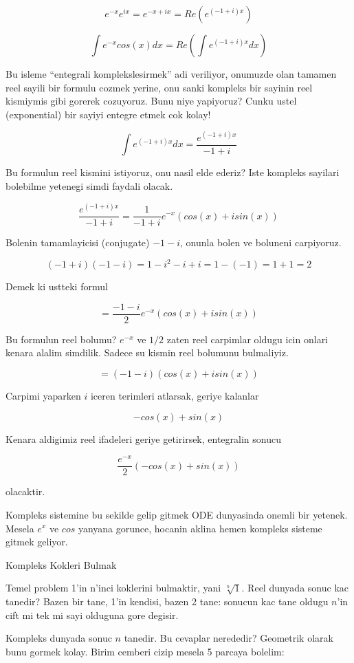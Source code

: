 \documentclass[12pt,fleqn]{article}
\begin{document}
\[ e^{-x}e^{ix} = e^{-x + ix} = Re(e^{(-1+i)x}) \]

\[ \int e^{-x}cos(x) dx = Re (\int e^{(-1+i)x} dx) \]

Bu isleme ``entegrali komplekslesirmek'' adi veriliyor, onumuzde olan
tamamen reel sayili bir formulu cozmek yerine, onu sanki kompleks bir
sayinin reel kismiymis gibi gorerek cozuyoruz. Bunu niye yapiyoruz? Cunku
ustel (exponential) bir sayiyi entegre etmek cok kolay!

\[ \int e^{(-1+i)x} dx = \frac{e^{(-1+i)x}}{-1+i}\]

Bu formulun reel kismini istiyoruz, onu nasil elde ederiz? Iste kompleks
sayilari bolebilme yetenegi simdi faydali olacak.

\[  \frac{e^{(-1+i)x}}{-1+i} = \frac{1}{-1+i} e^{-x}(cos(x) + isin(x))\]

Bolenin tamamlayicisi (conjugate) $-1-i$, onunla bolen ve boluneni
carpiyoruz.

\[ (-1+i)(-1-i) = 1-i^2-i+i = 1-(-1) = 1+1 = 2\]

Demek ki ustteki formul

\[ = \frac{-1-i}{2} e^{-x}(cos(x) + isin(x)) \]

Bu formulun reel bolumu? $e^{-x}$ ve $1/2$ zaten reel carpimlar oldugu icin
onlari kenara alalim simdilik. Sadece su kismin reel bolumunu bulmaliyiz.

\[ = (-1-i)(cos(x) + isin(x)) \]

Carpimi yaparken $i$ iceren terimleri atlarsak, geriye kalanlar

\[ -cos(x) + sin(x) \]

Kenara aldigimiz reel ifadeleri geriye getirirsek, entegralin sonucu

\[ \frac{e^{-x}}{2}(-cos(x) + sin(x)) \]

olacaktir. 

Kompleks sistemine bu sekilde gelip gitmek ODE dunyasinda onemli bir
yetenek. Mesela $e^{x}$ ve $cos$ yanyana gorunce, hocanin aklina hemen
kompleks sisteme gitmek geliyor. 

Kompleks Kokleri Bulmak

Temel problem 1'in n'inci koklerini bulmaktir, yani $\sqrt[n]{1}$. Reel
dunyada sonuc kac tanedir? Bazen bir tane, 1'in kendisi, bazen 2 tane:
sonucun kac tane oldugu $n$'in cift mi tek mi sayi olduguna gore degisir.

Kompleks dunyada sonuc $n$ tanedir. Bu cevaplar nerededir? Geometrik olarak
bunu gormek kolay. Birim cemberi cizip mesela 5 parcaya bolelim:
\end{document}
